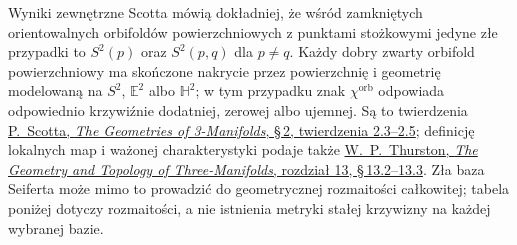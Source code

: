 Wyniki zewnętrzne Scotta mówią dokładniej, że wśród zamkniętych
orientowalnych orbifoldów powierzchniowych z punktami stożkowymi
jedyne złe przypadki to $S^2(p)$ oraz $S^2(p,q)$ dla $p\ne q$.
Każdy dobry zwarty orbifold powierzchniowy ma skończone
nakrycie przez powierzchnię i geometrię modelowaną na
$S^2$, $\mathbb E^2$ albo $\mathbb H^2$; w tym przypadku
znak $\chi^{\mathrm{orb}}$ odpowiada odpowiednio krzywiźnie
dodatniej, zerowej albo ujemnej. Są to twierdzenia
\href{https://sschleimer.warwick.ac.uk/Teach/2021_3MFDS/References/1983the_geometries_of_three-manifolds.pdf}
{P.\ Scotta, \emph{The Geometries of 3-Manifolds},
\S\,2, twierdzenia 2.3--2.5}; definicję lokalnych map i
ważonej charakterystyki podaje także
\href{https://library.slmath.org/nonmsri/gt3m/PDF/13.pdf}
{W.\ P.\ Thurston, \emph{The Geometry and Topology of
Three-Manifolds}, rozdział 13, \S\,13.2--13.3}.
Zła baza Seiferta może mimo to prowadzić do geometrycznej
rozmaitości całkowitej; tabela poniżej dotyczy rozmaitości,
a nie istnienia metryki stałej krzywizny na każdej wybranej bazie.

